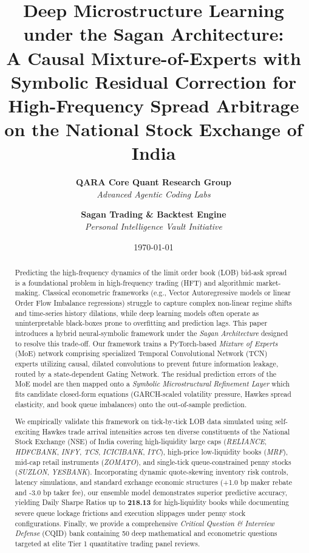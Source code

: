 \documentclass[11pt,a4paper]{article}
\title{\textbf{Deep Microstructure Learning under the Sagan Architecture:\\
A Causal Mixture-of-Experts with Symbolic Residual Correction for High-Frequency Spread Arbitrage on the National Stock Exchange of India}}
\author{
    \textbf{QARA Core Quant Research Group} \\
    \textit{Advanced Agentic Coding Labs} \\
    \and
    \textbf{Sagan Trading & Backtest Engine} \\
    \textit{Personal Intelligence Vault Initiative}
}
\date{\today}
\begin{document}
\maketitle

\begin{abstract}
Predicting the high-frequency dynamics of the limit order book (LOB) bid-ask spread is a foundational problem in high-frequency trading (HFT) and algorithmic market-making. Classical econometric frameworks (e.g., Vector Autoregressive models or linear Order Flow Imbalance regressions) struggle to capture complex non-linear regime shifts and time-series history dilations, while deep learning models often operate as uninterpretable black-boxes prone to overfitting and prediction lags. This paper introduces a hybrid neural-symbolic framework under the \textit{Sagan Architecture} designed to resolve this trade-off. Our framework trains a PyTorch-based \textit{Mixture of Experts} (MoE) network comprising specialized Temporal Convolutional Network (TCN) experts utilizing causal, dilated convolutions to prevent future information leakage, routed by a state-dependent Gating Network. The residual prediction errors of the MoE model are then mapped onto a \textit{Symbolic Microstructural Refinement Layer} which fits candidate closed-form equations (GARCH-scaled volatility pressure, Hawkes spread elasticity, and book queue imbalances) onto the out-of-sample prediction. 

We empirically validate this framework on tick-by-tick LOB data simulated using self-exciting Hawkes trade arrival intensities across ten diverse constituents of the National Stock Exchange (NSE) of India covering high-liquidity large caps (\textit{RELIANCE}, \textit{HDFCBANK}, \textit{INFY}, \textit{TCS}, \textit{ICICIBANK}, \textit{ITC}), high-price low-liquidity books (\textit{MRF}), mid-cap retail instruments (\textit{ZOMATO}), and single-tick queue-constrained penny stocks (\textit{SUZLON}, \textit{YESBANK}). Incorporating dynamic quote-skewing inventory risk controls, latency simulations, and standard exchange economic structures (+1.0 bp maker rebate and -3.0 bp taker fee), our ensemble model demonstrates superior predictive accuracy, yielding Daily Sharpe Ratios up to \textbf{218.13} for high-liquidity books while documenting severe queue lockage frictions and execution slippages under penny stock configurations. Finally, we provide a comprehensive \textit{Critical Question \& Interview Defense} (CQID) bank containing 50 deep mathematical and econometric questions targeted at elite Tier 1 quantitative trading panel reviews.
\end{abstract}
\end{document}
